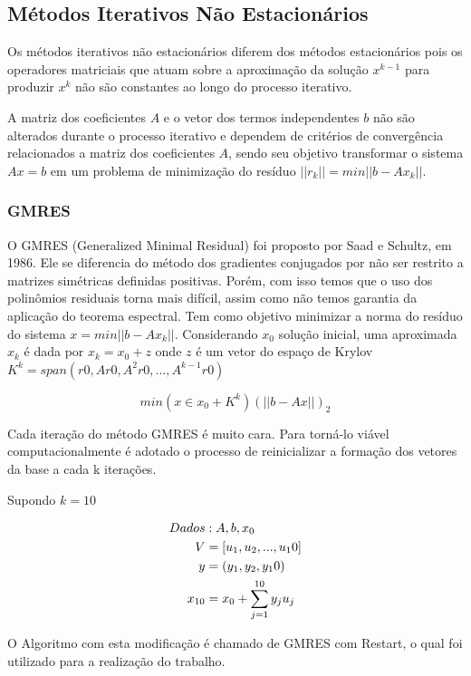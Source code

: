 \documentclass[
	11pt,				%
	oneside,			%
	a4paper,			%
	english,			%
	brazil,				%
	]{article}
\begin{document}
\subsection{Métodos Iterativos Não Estacionários}
Os métodos iterativos não estacionários diferem dos métodos estacionários pois os operadores matriciais que atuam sobre a aproximação da solução $x^{k-1}$ para produzir $x^k$ não são constantes ao longo do processo iterativo.

A matriz dos coeficientes $A$ e o vetor dos termos independentes $b$ não são alterados durante o processo iterativo e dependem de critérios de convergência relacionados a matriz dos coeficientes $A$, sendo seu objetivo transformar o sistema $Ax = b$ em um problema de minimização do resíduo $||r_k|| = min ||b - Ax_k||$.

\subsubsection{GMRES}
O GMRES (Generalized Minimal Residual) foi proposto por Saad e Schultz, em 1986. Ele se diferencia do método dos gradientes conjugados por não ser restrito a matrizes simétricas definidas positivas. Porém, com isso temos que o uso dos polinômios residuais torna mais difícil, assim como não temos garantia da aplicação do teorema espectral. Tem como objetivo minimizar a norma do resíduo do sistema $x = min ||b-Ax_k||$. Considerando $x_0$ solução inicial, uma aproximada $x_k$ é dada por $x_k = x_0 + z$  onde $z$ é um vetor do espaço de Krylov $K^k = span {(r0, Ar0,A^2r0,...,A^{k-1}r0)}$

\begin{equation*}
min(x \in x_0 + K^k) (||b-Ax||)_2
\end{equation*}

Cada iteração do método GMRES é muito cara. Para torná-lo viável computacionalmente é adotado o processo de reinicializar a formação dos vetores da base a cada k iterações.

\noindent Supondo $k=10$

\begin{align*}
\noindent Dados &: A,b,x_0 \\
V &= [u_1, u_2,...,u_10] \\
y &= (y_1, y_2, y_10) \\
x_{10} &= x_0 + \sum\limits_{j=1}^{10}y_j u_j
\end{align*}

O Algoritmo com esta modificação é chamado de GMRES com Restart, o qual foi utilizado para a realização do trabalho.\\
\end{document}
